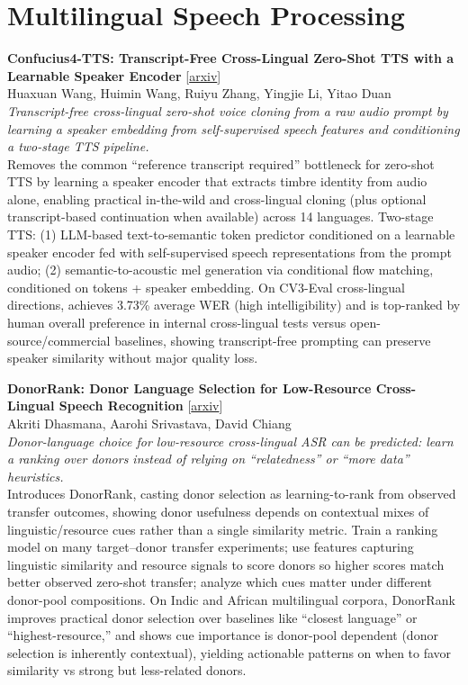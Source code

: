 \documentclass[12pt,letterpaper]{article}
\begin{document}
\medskip


\section*{Multilingual Speech Processing}

{\small\textbf{Confucius4-TTS: Transcript-Free Cross-Lingual Zero-Shot TTS with a Learnable Speaker Encoder}} {\scriptsize[\href{https://arxiv.org/abs/2608.11650}{arxiv}]}\\
{\scriptsize Huaxuan Wang, Huimin Wang, Ruiyu Zhang, Yingjie Li, Yitao Duan}\\

{\small\textit{Transcript-free cross-lingual zero-shot voice cloning from a raw audio prompt by learning a speaker embedding from self-supervised speech features and conditioning a two-stage TTS pipeline.}}\\[1pt]
{\footnotesize Removes the common ``reference transcript required'' bottleneck for zero-shot TTS by learning a speaker encoder that extracts timbre identity from audio alone, enabling practical in-the-wild and cross-lingual cloning (plus optional transcript-based continuation when available) across 14 languages. Two-stage TTS: (1) LLM-based text-to-semantic token predictor conditioned on a learnable speaker encoder fed with self-supervised speech representations from the prompt audio; (2) semantic-to-acoustic mel generation via conditional flow matching, conditioned on tokens + speaker embedding. On CV3-Eval cross-lingual directions, achieves 3.73\% average WER (high intelligibility) and is top-ranked by human overall preference in internal cross-lingual tests versus open-source/commercial baselines, showing transcript-free prompting can preserve speaker similarity without major quality loss.}

\medskip

{\small\textbf{DonorRank: Donor Language Selection for Low-Resource Cross-Lingual Speech Recognition}} {\scriptsize[\href{https://arxiv.org/abs/2608.11441}{arxiv}]}\\
{\scriptsize Akriti Dhasmana, Aarohi Srivastava, David Chiang}\\

{\small\textit{Donor-language choice for low-resource cross-lingual ASR can be predicted: learn a ranking over donors instead of relying on ``relatedness'' or ``more data'' heuristics.}}\\[1pt]
{\footnotesize Introduces DonorRank, casting donor selection as learning-to-rank from observed transfer outcomes, showing donor usefulness depends on contextual mixes of linguistic/resource cues rather than a single similarity metric. Train a ranking model on many target--donor transfer experiments; use features capturing linguistic similarity and resource signals to score donors so higher scores match better observed zero-shot transfer; analyze which cues matter under different donor-pool compositions. On Indic and African multilingual corpora, DonorRank improves practical donor selection over baselines like ``closest language'' or ``highest-resource,'' and shows cue importance is donor-pool dependent (donor selection is inherently contextual), yielding actionable patterns on when to favor similarity vs strong but less-related donors.}
\end{document}
